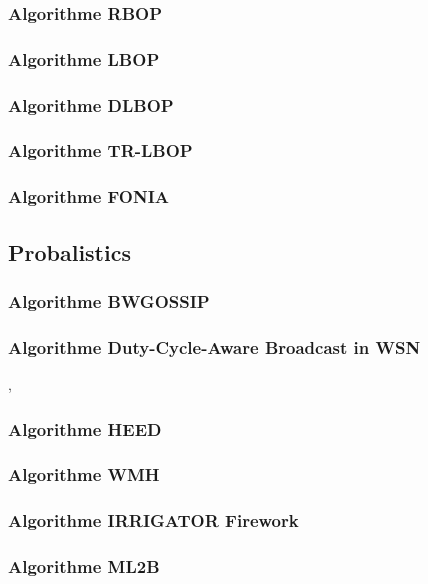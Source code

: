 \subsubsection{Algorithme RBOP}
\cite{Cartigny2005}
\subsubsection{Algorithme LBOP}
\cite{Cartigny2005}
\subsubsection{Algorithme DLBOP}
\cite{Cartigny2004}
\subsubsection{Algorithme TR-LBOP}
\cite{Ingelrest2004}
\subsubsection{Algorithme FONIA}




\subsection{Probalistics}


\subsubsection{Algorithme BWGOSSIP}
\cite{lutzeler2011}
\subsubsection{Algorithme Duty-Cycle-Aware Broadcast in WSN }
\cite{Wang2009},\cite{Wang2010}
\subsubsection{Algorithme HEED}
\cite{Younis2004}
\subsubsection{Algorithme WMH}
\cite{Agarwal2005}
\subsubsection{Algorithme IRRIGATOR  Firework}
\cite{orecchia2004}
\subsubsection{Algorithme ML2B}
\cite{zhaobroadcast}
